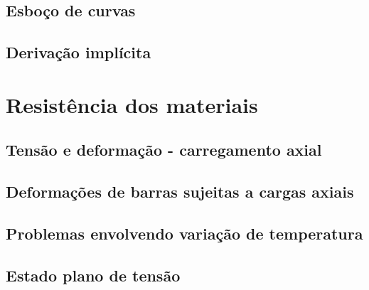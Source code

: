 \documentclass[12pt, a4paper]{article}
\begin{document}
		\subsection{Esboço de curvas}
		
		
		\subsection{Derivação implícita}
		
		
		
	\section{Resistência dos materiais}
		\subsection{Tensão e deformação - carregamento axial}
		
		
		\subsection{Deformações de barras sujeitas a cargas axiais}		
		
		
		\subsection{Problemas envolvendo variação de temperatura}
			
		
		\subsection{Estado plano de tensão}
		
		
\end{document}
